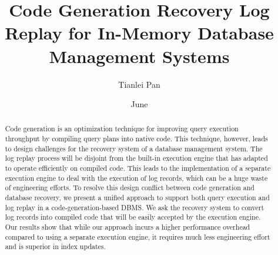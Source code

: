 \documentclass[12pt]{cmuthesis}
\begin{document}
 
\frontmatter

\pagestyle{empty}

\title{ %
{\bf Code Generation Recovery Log Replay for In-Memory Database Management Systems}}
\author{Tianlei Pan}
\date{June}


\support{}
\disclaimer{}



\maketitle

\begin{dedication}
\end{dedication}

\pagestyle{plain} %


\begin{abstract}
Code generation is an optimization technique for improving query execution throughput by compiling query plans into native code. This technique, however, leads to design challenges for the recovery system of a database management system. The log replay process will be disjoint from the built-in execution engine that has adapted to operate efficiently on compiled code. This leads to the implementation of a separate execution engine to deal with the execution of log records, which can be a huge waste of engineering efforts. To resolve this design conflict between code generation and database recovery, we present a unified approach to support both query execution and log replay in a code-generation-based DBMS. We ask the recovery system to convert log records into compiled code that will be easily accepted by the execution engine. Our results show that while our approach incurs a higher performance overhead compared to using a separate execution engine, it requires much less engineering effort and is superior in index updates.
\end{abstract}
\end{document}
